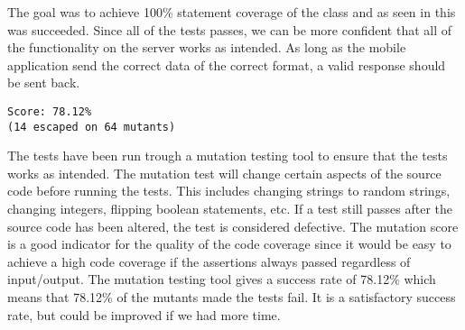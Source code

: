 The goal was to achieve 100\% statement coverage of the  class and as seen in  this was succeeded. Since all of the tests passes, we can be more confident that all of the functionality on the server works as intended. As long as the mobile application send the correct data of the correct format, a valid response should be sent back.

\begin{lstlisting}[numbers=none, basicstyle=\ttfamily, caption={The result of the Mutagenesis test.}]
Score: 78.12%
(14 escaped on 64 mutants)
\end{lstlisting}

The tests have been run trough a mutation testing tool\cite{mutagenesis} to ensure that the tests works as intended. The mutation test will change certain aspects of the source code before running the tests. This includes changing strings to random strings, changing integers, flipping boolean statements, etc. If a test still passes after the source code has been altered, the test is considered defective. The mutation score is a good indicator for the quality of the code coverage since it would be easy to achieve a high code coverage if the assertions always passed regardless of input/output. The mutation testing tool gives a success rate of 78.12\% which means that 78.12\% of the mutants made the tests fail. It is a satisfactory success rate, but could be improved if we had more time.

